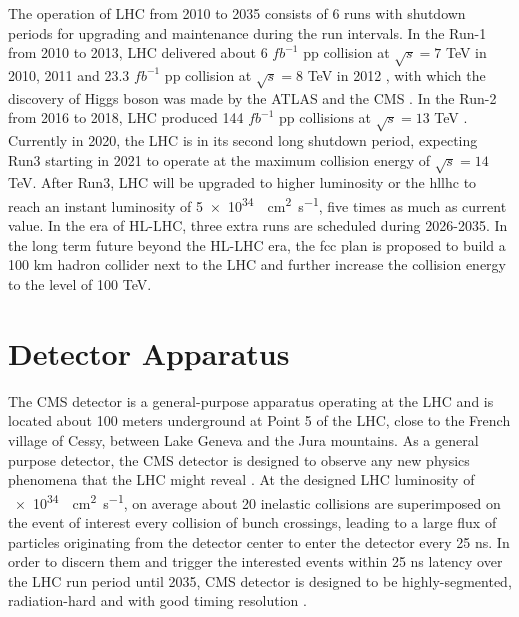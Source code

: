 The operation of LHC from 2010 to 2035 consists of 6 runs with shutdown periods for upgrading and maintenance during the run intervals. In the Run-1 from 2010 to 2013, LHC delivered about 6 $fb^{-1}$ pp collision at $\sqrt{s}=7$ TeV in 2010, 2011 and 23.3 $fb^{-1}$ pp collision at $\sqrt{s}=8$ TeV in 2012 \cite{cms:publicLumiInfo}, with which the discovery of Higgs boson was made by the ATLAS \cite{exhep:atlasHiggsDisc:Aad:2012tfa} and the CMS \cite{exhep:cmsHiggsDisc:Chatrchyan:2012ufa}. In the Run-2 from 2016 to 2018, LHC produced 144 $fb^{-1}$ pp collisions at $\sqrt{s}=13$ TeV \cite{cms:publicLumiInfo}. Currently in 2020, the LHC is in its second long shutdown period, expecting Run3 starting in 2021 to operate at the maximum collision energy of $\sqrt{s}=14$ TeV. After Run3, LHC will be upgraded to higher luminosity or the \acrfull{hllhc} to reach an instant luminosity of \SI{5e34}{\per\cm\squared \per\s}, five times as much as current value. In the era of HL-LHC, three extra runs are scheduled during 2026-2035. In the long term future beyond the HL-LHC era, the \acrfull{fcc} \cite{exhep:fcc:Benedikt:2715354} plan is proposed to build a 100 km hadron collider next to the LHC and further increase the collision energy to the level of 100 TeV.




\section{Detector Apparatus}
\label{sec:exp:apparatus}

The CMS \cite{exhep:cms:Chatrchyan:2008aa} detector is a general-purpose apparatus operating at the LHC and is located about 100 meters underground at Point 5 of the LHC, close to the French village of Cessy, between Lake Geneva and the Jura mountains. As a general purpose detector, the CMS detector is designed to observe any new physics phenomena that the LHC might reveal \cite{cms:tdr2:Ball:2007zza}. At the designed LHC luminosity of \SI{e34}{\per\cm\squared \per\s}, on average about 20 inelastic collisions are superimposed on the event of interest every collision of bunch crossings, leading to a large flux of particles originating from the detector center to enter the detector every 25 ns. In order to discern them and trigger the interested events within 25 ns latency over the LHC run period until 2035, CMS detector is designed to be highly-segmented, radiation-hard and with good timing resolution \cite{exhep:cms:Chatrchyan:2008aa}.

